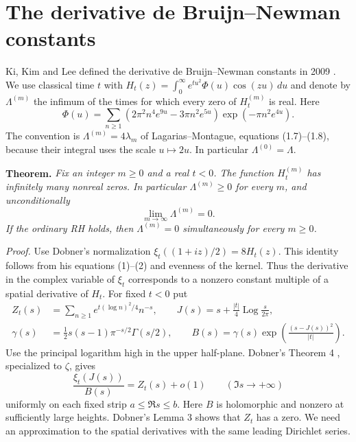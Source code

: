 \documentclass[11pt,a4paper]{article}
\begin{document}
\section{The derivative de Bruijn--Newman constants}\label{sec:derivativeflow}

Ki, Kim and Lee defined the derivative de Bruijn--Newman constants in
2009 \cite{KKL,LM}. We use classical time $t$ with
$H_t(z)=\int_0^\infty e^{tu^2}\Phi(u)\cos(zu)\,du$ and denote
by $\Lambda^{(m)}$ the infimum of the times for which every zero of
$H_t^{(m)}$ is real. Here
\[
 \Phi(u)=\sum_{n\ge1}(2\pi^2 n^4e^{9u}-3\pi n^2e^{5u})
                          \exp(-\pi n^2e^{4u}).
\]
The convention is $\Lambda^{(m)}=4\lambda_m$
of Lagarias--Montague, equations (1.7)--(1.8), because their integral
uses the scale $u\mapsto 2u$. In particular $\Lambda^{(0)}=\Lambda$.

\medskip\noindent
\textbf{Theorem.} \emph{Fix an integer $m\ge0$ and a real $t<0$.
The function $H_t^{(m)}$ has infinitely many nonreal zeros.
In particular $\Lambda^{(m)}\ge0$ for every $m$, and unconditionally}
\[
 \lim_{m\to\infty}\Lambda^{(m)}=0.
\]
\emph{If the ordinary RH holds, then $\Lambda^{(m)}=0$ simultaneously
for every $m\ge0$.}

\medskip\noindent
\emph{Proof.} Use Dobner's normalization
$\xi_t((1+iz)/2)=8H_t(z)$. This identity follows from his
equations (1)--(2) and evenness of the kernel. Thus the derivative
in the complex variable of $\xi_t$ corresponds to a nonzero
constant multiple of a spatial derivative of $H_t$.
For fixed $t<0$ put
\[
 \begin{split}
 Z_t(s)&=\sum_{n\ge1}e^{t(\log n)^2/4}n^{-s},\qquad
 J(s)=s+\frac{|t|}{4}\operatorname{Log}\frac{s}{2\pi},\\
 \gamma(s)&=\tfrac12s(s-1)\pi^{-s/2}\Gamma(s/2),\qquad
 B(s)=\gamma(s)\exp\left(\frac{(s-J(s))^2}{|t|}\right).
 \end{split}
\]
Use the principal logarithm high in the upper half-plane. Dobner's Theorem 4 \cite{Dobner}, specialized to $\zeta$, gives
\[
 \frac{\xi_t(J(s))}{B(s)}=Z_t(s)+o(1)
 \qquad (\Im s\to+\infty)
\]
uniformly on each fixed strip $a\le\Re s\le b$. Here $B$ is holomorphic
and nonzero at sufficiently large heights. Dobner's Lemma 3 shows
that $Z_t$ has a zero. We need an approximation to the spatial
derivatives with the same leading Dirichlet series.
\end{document}
